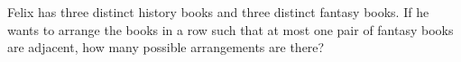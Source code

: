 Felix has three distinct history books and three distinct fantasy books. If he wants to arrange the books in a row such that at most one pair of fantasy books are adjacent, how many possible arrangements are there?
